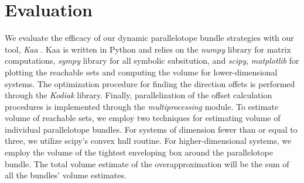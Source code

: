 \vspace{-1em}
\section{Evaluation}
\label{sec:eval}
 We evaluate the efficacy of our dynamic parallelotope bundle strategies with our tool, \emph{Kaa} \cite{kim2020kaa}. Kaa is written in Python and relies on the \emph{numpy} library for matrix computations, \emph{sympy} library for all symbolic subsitution, and \emph{scipy}, \emph{matplotlib} for plotting the reachable sets and computing the volume for lower-dimensional systems. The optimization procedure for finding the direction offets is performed through the \emph{Kodiak} library. Finally, parallelization of the offset calculation procedures is implemented through the \emph{multiprocessing} module. To estimate volume of reachable sets, we employ two techniques for estimating volume of individual parallelotope bundles. For systems of dimension fewer than or equal to three, we utilize scipy's convex hull routine.
For higher-dimensional systems, we employ the volume of the tightest enveloping box around the parallelotope bundle.
The total volume estimate of the overapproximation will be the sum of all the bundles' volume estimates.

\vspace{-1em}
